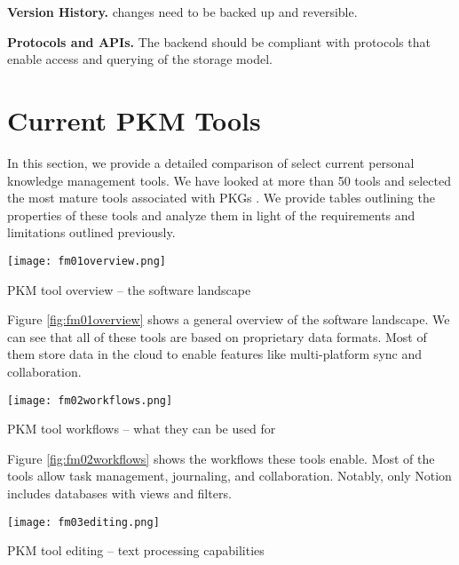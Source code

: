 \textbf{Version History.} changes need to be backed up and reversible.

\textbf{Protocols and APIs.} The backend should be compliant with protocols that enable access and querying of the storage model.







\section{Current PKM Tools}

In this section, we provide a detailed comparison of select current personal knowledge management tools. We have looked at more than 50 tools and selected the most mature tools associated with PKGs \cite{notion, obsidian, roam, logseq, remnote}. We provide tables outlining the properties of these tools and analyze them in light of the requirements and limitations outlined previously.

\begin{table}[H]
    \centering
    \texttt{[image: fm01overview.png]}
    \caption{PKM tool overview -- the software landscape}
    \label{fig:fm01overview}
\end{table}

Figure \ref{fig:fm01overview} shows a general overview of the software landscape. We can see that all of these tools are based on proprietary data formats. Most of them store data in the cloud to enable features like multi-platform sync and collaboration.


\begin{table}[H]
    \centering
    \texttt{[image: fm02workflows.png]}
    \caption{PKM tool workflows -- what they can be used for}
    \label{fig:fm02workflows}
\end{table}

Figure \ref{fig:fm02workflows} shows the workflows these tools enable. Most of the tools allow task management, journaling, and collaboration. Notably, only Notion includes databases with views and filters.

\begin{table}[H]
    \centering
    \texttt{[image: fm03editing.png]}
    \caption{PKM tool editing -- text processing capabilities}
    \label{fig:fm03editing}
\end{table}

